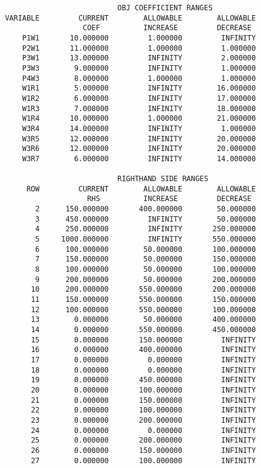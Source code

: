 \documentclass[12pt]{report}
\begin{document}
\begin{verbatim}
                           OBJ COEFFICIENT RANGES
 VARIABLE         CURRENT        ALLOWABLE        ALLOWABLE
                   COEF          INCREASE         DECREASE
     P1W1       10.000000         1.000000         INFINITY
     P2W1       11.000000         1.000000         1.000000
     P3W1       13.000000         INFINITY         2.000000
     P3W3        9.000000         INFINITY         1.000000
     P4W3        8.000000         1.000000         1.000000
     W1R1        5.000000         INFINITY        16.000000
     W1R2        6.000000         INFINITY        17.000000
     W1R3        7.000000         INFINITY        18.000000
     W1R4       10.000000         1.000000        21.000000
     W3R4       14.000000         INFINITY         1.000000
     W3R5       12.000000         INFINITY        20.000000
     W3R6       12.000000         INFINITY        20.000000
     W3R7        6.000000         INFINITY        14.000000

                           RIGHTHAND SIDE RANGES
      ROW         CURRENT        ALLOWABLE        ALLOWABLE
                    RHS          INCREASE         DECREASE
        2      150.000000       400.000000        50.000000
        3      450.000000         INFINITY        50.000000
        4      250.000000         INFINITY       250.000000
        5     1000.000000         INFINITY       550.000000
        6      100.000000        50.000000       100.000000
        7      150.000000        50.000000       150.000000
        8      100.000000        50.000000       100.000000
        9      200.000000        50.000000       200.000000
       10      200.000000       550.000000       200.000000
       11      150.000000       550.000000       150.000000
       12      100.000000       550.000000       100.000000
       13        0.000000        50.000000       400.000000
       14        0.000000       550.000000       450.000000
       15        0.000000       150.000000         INFINITY
       16        0.000000       400.000000         INFINITY
       17        0.000000         0.000000         INFINITY
       18        0.000000         0.000000         INFINITY
       19        0.000000       450.000000         INFINITY
       20        0.000000       100.000000         INFINITY
       21        0.000000       150.000000         INFINITY
       22        0.000000       100.000000         INFINITY
       23        0.000000       200.000000         INFINITY
       24        0.000000         0.000000         INFINITY
       25        0.000000       200.000000         INFINITY
       26        0.000000       150.000000         INFINITY
       27        0.000000       100.000000         INFINITY
\end{verbatim}
\end{document}
